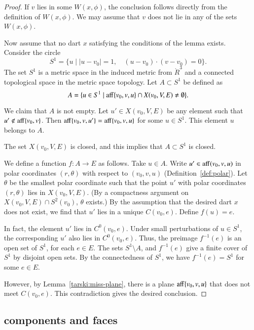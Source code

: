 \begin{proof} 
If $v$ lies in some $W(x,\phi)$, the conclusion follows
directly from the definition of $W(x,\phi)$.  We may
assume that $v$ does not lie in any of the sets $W(x,\phi)$.

Now assume that no  dart $x$ satisfying the conditions
of the lemma exists.  
Consider the circle
   $$S^1 = \{u\mid |u-v_0|=1,\quad
     (u-v_0)\cdot (v-v_0) = 0\}.$$
The set $S^1$ is a metric space in the induced metric
from $\ring{R}^3$ and a connected topological space in the
metric space topology.
Let $A\subset S^1$ be defined as
  $$
  A = \{u \in S^1 \mid  {\operatorname{aff}}\{v_0,v,u\} \cap X(v_0,V,E)\ne\emptyset\}.
  $$

We claim that $A$ is not empty.  Let $u'\in X(v_0,V,E)$ be any
element such that $u'\not\in {\operatorname{aff}}\{v_0,v\}$.  Then
${\operatorname{aff}}\{v_0,v,u'\} = {\operatorname{aff}}\{v_0,v,u\}$ for some $u\in S^1$.
This element $u$ belongs to $A$.

The set $X(v_0,V,E)$ is closed, and this implies that $A\subset S^1$
is closed.  

We define a function $f:A\to E$ as follows.  Take $u\in A$.
Write
$u'\in{\operatorname{aff}}(v_0,v,u)$ in polar coordinates
$(r,\theta)$ with respect to $(v_0,v,u)$ (Definition~\ref{def:polar}).
Let $\theta$ be the smallest polar coordinate such
that the point $u'$ with polar coordinates $(r,\theta)$ lies
in $X(v_0,V,E)$.  (By a compactness argument
on $X(v_0,V,E)\cap S^2(v_0)$, $\theta$ exists.)  By the
assumption that the desired dart $x$ does not exist, we
find that $u'$ lies in a unique $C(v_0,e)$.  Define $f(u)=e$.

In fact, the element $u'$  lies in $C^0(v_0,e)$.  Under small
perturbations of $u\in S^1$, the corresponding $u'$ also
lies in $C^0(v_0,e)$.  Thus, the preimage $f^{-1}(e)$ is an
open set of $S^1$, for each $e\in E$.  The sets $S^1\setminus A$,
and $f^{-1}(e)$ give a finite cover of $S^1$ by disjoint open
sets.  By the connectedness of $S^1$, we have $f^{-1}(e)=S^1$
for some $e\in E$.

However, by Lemma~\ref{tarski:miss-plane}, there is a 
plane ${\operatorname{aff}}\{v_0,v,u\}$ that does not meet $C(v_0,e)$.
This contradiction gives the desired conclusion.
\end{proof}


\subsection{components and faces}

